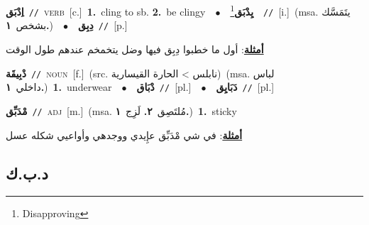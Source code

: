 \documentclass[10pt,a4paper,twoside]{article} %
\begin{document}
\begin{multicols}{2}
{{{{\setlength\topsep{0pt}\textbf{\foreignlanguage{arabic}{اِدْبَق}}\ {\color{gray}\texttt{//}\color{black}}\ \textsc{verb}\ [c.]\ \textbf{1.}~cling to sb.  \textbf{2.}~be clingy\ \ $\bullet$\ \ \setlength\topsep{0pt}\textbf{\foreignlanguage{arabic}{يِدْبَق}}\footnote{Disapproving}\ \ {\color{gray}\texttt{//}\color{black}}\ [i.]\ \color{gray}(msa. \foreignlanguage{arabic}{يتَمَسَّك بشخص}~\foreignlanguage{arabic}{\textbf{١.}})\color{black}\ \ $\bullet$\ \ \setlength\topsep{0pt}\textbf{\foreignlanguage{arabic}{دِبِق}}\ {\color{gray}\texttt{//}\color{black}}\ [p.]\  \begin{flushright}\color{gray}\foreignlanguage{arabic}{\textbf{\underline{\foreignlanguage{arabic}{أمثلة}}}: أول ما خطبوا دِبِق فيها وضل يتخمخم عندهم طول الوقت}\end{flushright}\color{black}} \vspace{2mm}

{\setlength\topsep{0pt}\textbf{\foreignlanguage{arabic}{دْبِيقَة}}\ {\color{gray}\texttt{//}\color{black}}\ \textsc{noun}\ [f.]\ (src. \color{gray}\foreignlanguage{arabic}{نابلس > الحارة القيسارية}\color{black})\ \color{gray}(msa. \foreignlanguage{arabic}{لباس داخلي}~\foreignlanguage{arabic}{\textbf{١.}})\color{black}\ \textbf{1.}~underwear\ \ $\bullet$\ \ \setlength\topsep{0pt}\textbf{\foreignlanguage{arabic}{دْبَاق}}\ {\color{gray}\texttt{//}\color{black}}\ [pl.]\ \ $\bullet$\ \ \setlength\topsep{0pt}\textbf{\foreignlanguage{arabic}{دَبَايِق}}\ {\color{gray}\texttt{//}\color{black}}\ [pl.]\ 

{\setlength\topsep{0pt}\textbf{\foreignlanguage{arabic}{مْدَبِّق}}\ {\color{gray}\texttt{//}\color{black}}\ \textsc{adj}\ [m.]\ \color{gray}(msa. \foreignlanguage{arabic}{مُلتَصِق}~\foreignlanguage{arabic}{\textbf{٢.}}  \foreignlanguage{arabic}{لَزِج}~\foreignlanguage{arabic}{\textbf{١.}})\color{black}\ \textbf{1.}~sticky\  \begin{flushright}\color{gray}\foreignlanguage{arabic}{\textbf{\underline{\foreignlanguage{arabic}{أمثلة}}}: في شي مْدَبِّق عإِيدي ووجدهي وأواعيي شكله عسل}\end{flushright}\color{black}} \vspace{2mm}

\vspace{-3mm}
\subsection*{\color{blue}\foreignlanguage{arabic}{د.ب.ك}\color{blue}{}} 

}}}}
\end{multicols}
\end{document}
